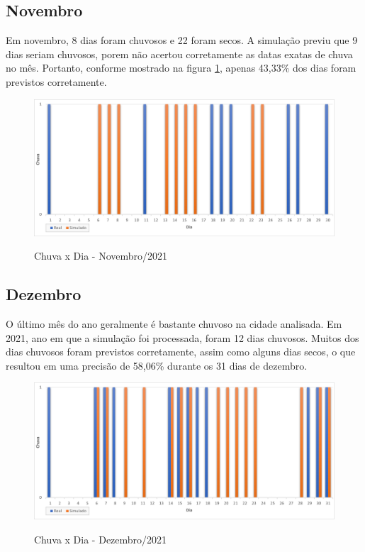\subsection{Novembro}
Em novembro, 8 dias foram chuvosos e 22 foram secos. A simulação previu que 9 dias seriam chuvosos, porem não acertou corretamente as datas exatas de chuva no mês. Portanto, conforme mostrado na figura \ref{f.rnov}, apenas 43,33\% dos dias foram previstos corretamente.
\begin{figure}[H]
	\caption{\small Chuva x Dia - Novembro/2021}
	\centering
	\includegraphics[width=\textwidth]{figs/nov.png}
	\label{f.rnov}
\end{figure}

\subsection{Dezembro}
O último mês do ano geralmente é bastante chuvoso na cidade analisada. Em 2021, ano em que a simulação foi processada, foram 12 dias chuvosos. Muitos dos dias chuvosos foram previstos corretamente, assim como alguns dias secos, o que resultou em uma precisão de 58,06\% durante os 31 dias de dezembro.
\begin{figure}[H]
	\caption{\small Chuva x Dia - Dezembro/2021}
	\centering
	\includegraphics[width=\textwidth]{figs/dez.png}
	\label{f.rdez}
\end{figure}


